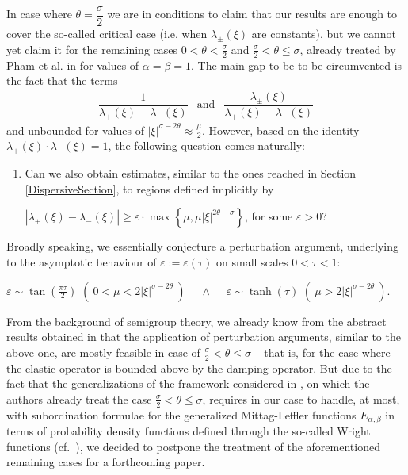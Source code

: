 \documentclass{amsart}
\theoremstyle{definition}
\theoremstyle{remark}
\numberwithin{equation}{section}
\begin{document}
{			
			In case where $\theta=\dfrac{\sigma}{2}$ we are in conditions to claim that our results are enough to cover the so-called critical case (i.e. when $\lambda_\pm(\xi)$ are constants), but we cannot yet claim it for the remaining cases 
			$\displaystyle 0<\theta<\frac{\sigma}{2}$ and $\displaystyle \frac{\sigma}{2}<\theta\leq \sigma$,
			already treated by Pham et al. in \cite{PMR15} for values of $\alpha=\beta=1$. The main gap to be to be circumvented is the fact that the terms
			\begin{eqnarray*}
				\dfrac{1}{\lambda_+(\xi)-\lambda_-(\xi)} &\mbox{and}&
				\dfrac{\lambda_\pm(\xi)}{\lambda_+(\xi)-\lambda_-(\xi)}
			\end{eqnarray*}
			and unbounded for values of $\displaystyle  |\xi|^{\sigma-2\theta}\approx\frac{\mu}{2}$. 
			However, based on the identity $\lambda_{+}(\xi)\cdot \lambda_-(\xi)=1$, the following question comes naturally:
			\begin{enumerate}
				\item[\bf Q3:] Can we also obtain estimates, similar to the ones reached in Section \ref{DispersiveSection}, to regions defined implicitly by 
				\begin{center}
					$\displaystyle |\lambda_{+}(\xi)-\lambda_{-}(\xi)|\geq  \varepsilon\cdot \max\left\{ \mu,\mu |\xi|^{2\theta-\sigma}\right\}$,
					for some $\varepsilon>0$?
				\end{center}
			\end{enumerate}
			
			Broadly speaking, we essentially conjecture a perturbation argument, underlying to the asymptotic behaviour of $\varepsilon:=\varepsilon(\tau)$ on small scales $0<\tau<1$: 
			\begin{center}
				$\displaystyle \varepsilon \sim \tan\left(\frac{\pi\tau}{2}\right)$ $\left(~0< \mu<2|\xi|^{\sigma-2\theta}~\right)$~~~$\wedge$~~~$\displaystyle \varepsilon \sim \tanh\left(\tau\right)$ $\left(~\mu>2|\xi|^{\sigma-2\theta}~\right)$.
			\end{center}
			
			From the background of semigroup theory, we already know from the abstract results obtained in \cite[Section VI.3.a]{engel2000one} that the application of perturbation arguments, similar to the above one, are mostly feasible in case of $\displaystyle \frac{\sigma}{2}<\theta\leq\sigma$ -- that is, for the case where the elastic operator is bounded above by the damping operator. But due to the fact that the generalizations of the framework considered in \cite{PMR15}, on which the authors already treat the case $\displaystyle \frac{\sigma}{2}<\theta\leq \sigma$, requires in our case to handle, at most, with subordination formulae for the generalized Mittag-Leffler functions $E_{\alpha,\beta}$ in terms of probability density functions defined through the so-called Wright functions (cf.~\cite{Mainardi2020}), we decided to postpone the treatment of the aforementioned remaining cases for a forthcoming paper.
			
}
\end{document}
